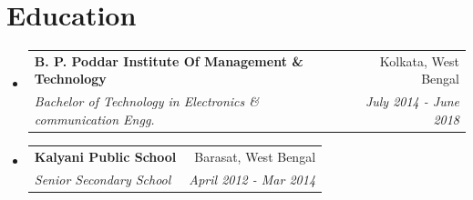 \documentclass[letterpaper,11pt]{article}
\makeatletter
\newcommand{\resumeSubheading}[4]{
  \vspace{-2pt}\item
    \begin{tabular*}{0.97\textwidth}[t]{l@{\extracolsep{\fill}}r}
      \textbf{#1} & #2 \\
      \textit{\small#3} & \textit{\small #4} \\
    \end{tabular*}\vspace{-7pt}
}
\newcommand{\resumeSubHeadingListStart}{\begin{itemize}[leftmargin=0.15in, label={}]}
\newcommand{\resumeSubHeadingListEnd}{\end{itemize}}
\makeatother
\begin{document}
\section{Education}
  \resumeSubHeadingListStart
    \resumeSubheading
      {B. P. Poddar Institute Of Management \& Technology}{Kolkata, West Bengal}
      {Bachelor of Technology in Electronics \& communication Engg.}{July 2014 - June 2018}
      \resumeSubheading
      {Kalyani Public School}{Barasat, West Bengal}
      {Senior Secondary School}{April 2012 - Mar 2014}
    
  \resumeSubHeadingListEnd

%
\end{document}

